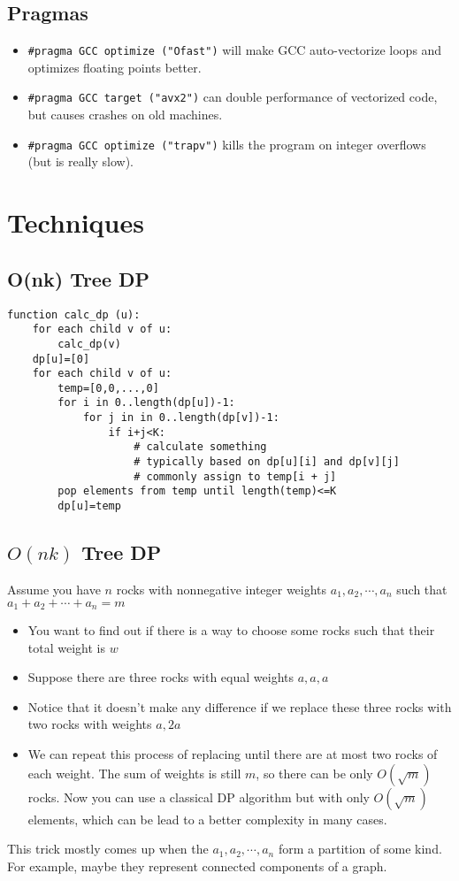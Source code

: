 	\subsection{Pragmas}
		\begin{itemize}
			\item \lstinline{#pragma GCC optimize ("Ofast")} will make GCC auto-vectorize loops and optimizes floating points better.
			\item \lstinline{#pragma GCC target ("avx2")} can double performance of vectorized code, but causes crashes on old machines.
			\item \lstinline{#pragma GCC optimize ("trapv")} kills the program on integer overflows (but is really slow).
		\end{itemize}
\section{Techniques}
	\subsection{O(nk) Tree DP}
\begin{lstlisting}
function calc_dp (u):
	for each child v of u:
		calc_dp(v)
	dp[u]=[0]
	for each child v of u:
		temp=[0,0,...,0]
		for i in 0..length(dp[u])-1:
			for j in in 0..length(dp[v])-1:
				if i+j<K:
					# calculate something 
					# typically based on dp[u][i] and dp[v][j]
					# commonly assign to temp[i + j]
		pop elements from temp until length(temp)<=K
		dp[u]=temp
\end{lstlisting}
\subsection{$O(nk)$ Tree DP}
Assume you have $n$ rocks with nonnegative integer weights $a_1,a_2,\cdots,a_n$ such that $a_1+a_2+\cdots+a_n=m$
\begin{itemize}
\item You want to find out if there is a way to choose some rocks such that their total weight is $w$
\item Suppose there are three rocks with equal weights $a,a,a$
\item Notice that it doesn't make any difference if we replace these three rocks with two rocks with weights $a,2a$
\item We can repeat this process of replacing until there are at most two rocks of each weight. The sum of weights is still $m$,
so there can be only $O(\sqrt{m})$ rocks. Now you can use a classical DP algorithm but with only $O(\sqrt{m})$
elements, which can be lead to a better complexity in many cases.
\end{itemize}
This trick mostly comes up when the $a_1,a_2,\cdots,a_n$ form a partition of some kind. 
For example, maybe they represent connected components of a graph.